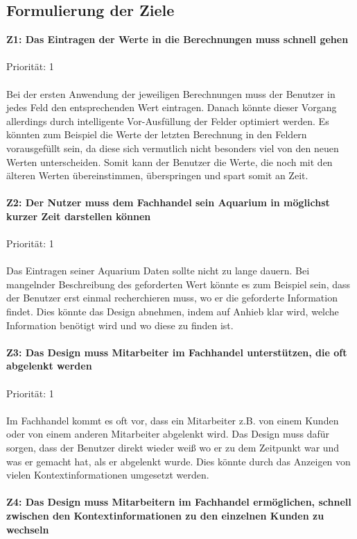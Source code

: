\subsection{Formulierung der Ziele}

\textbf{Z1: Das Eintragen der Werte in die Berechnungen muss schnell gehen}
\\ \\
Priorität: 1
\\ \\
Bei der ersten Anwendung der jeweiligen Berechnungen muss der Benutzer in jedes Feld den entsprechenden Wert eintragen. Danach könnte dieser Vorgang allerdings durch intelligente Vor-Ausfüllung der Felder optimiert werden. Es könnten zum Beispiel die Werte der letzten Berechnung in den Feldern vorausgefüllt sein, da diese sich vermutlich nicht besonders viel von den neuen Werten unterscheiden. Somit kann der Benutzer die Werte, die noch mit den älteren Werten übereinstimmen, überspringen und spart somit an Zeit.
\\ \\
\textbf{Z2: Der Nutzer muss dem Fachhandel sein Aquarium in möglichst kurzer Zeit darstellen können}
\\ \\
Priorität: 1
\\ \\
Das Eintragen seiner Aquarium Daten sollte nicht zu lange dauern. Bei mangelnder Beschreibung des geforderten Wert könnte es zum Beispiel sein, dass der Benutzer erst einmal recherchieren muss, wo er die geforderte Information findet. Dies könnte das Design abnehmen, indem auf Anhieb klar wird, welche Information benötigt wird und wo diese zu finden ist.
\\ \\
\textbf{Z3: Das Design muss Mitarbeiter im Fachhandel unterstützen, die oft abgelenkt werden}
\\ \\
Priorität: 1
\\ \\
Im Fachhandel kommt es oft vor, dass ein Mitarbeiter z.B. von einem Kunden oder von einem anderen Mitarbeiter abgelenkt wird. Das Design muss dafür sorgen, dass der Benutzer direkt wieder weiß wo er zu dem Zeitpunkt war und was er gemacht hat, als er abgelenkt wurde. Dies könnte durch das Anzeigen von vielen Kontextinformationen umgesetzt werden.
\\ \\
\textbf{Z4: Das Design muss Mitarbeitern im Fachhandel ermöglichen, schnell zwischen den Kontextinformationen zu den einzelnen Kunden zu wechseln}
